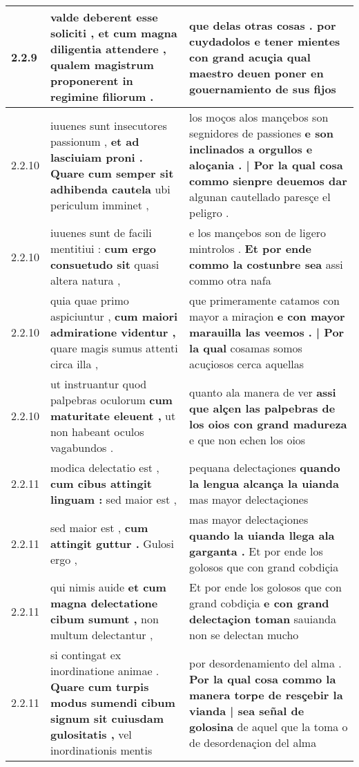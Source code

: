 \begin{tabular}{|p{1cm}|p{6.5cm}|p{6.5cm}|}
2.2.9 & valde deberent esse soliciti , \textbf{ et cum magna diligentia attendere , } qualem magistrum proponerent in regimine filiorum . & que delas otras cosas . \textbf{ por cuydadolos e tener mientes con grand acuçia } qual maestro deuen poner en gouernamiento de sus fijos \\\hline
2.2.10 & iuuenes sunt insecutores passionum , \textbf{ et ad lasciuiam proni . Quare cum semper sit adhibenda cautela } ubi periculum imminet , & los moços alos mançebos son segnidores de passiones \textbf{ e son inclinados a orgullos e aloçania . | Por la qual cosa commo sienpre deuemos dar } algunan cautellado paresçe el peligro . \\\hline
2.2.10 & iuuenes sunt de facili mentitiui : \textbf{ cum ergo consuetudo sit } quasi altera natura , & e los mançebos son de ligero mintrolos . \textbf{ Et por ende commo la costunbre sea } assi commo otra nafa \\\hline
2.2.10 & quia quae primo aspiciuntur , \textbf{ cum maiori admiratione videntur , } quare magis sumus attenti circa illa , & que primeramente catamos con mayor a miraçion \textbf{ e con mayor marauilla las veemos . | Por la qual } cosamas somos acuçiosos cerca aquellas \\\hline
2.2.10 & ut instruantur quod palpebras oculorum \textbf{ cum maturitate eleuent , } ut non habeant oculos vagabundos . & quanto ala manera de ver \textbf{ assi que alçen las palpebras de los oios con grand madureza } e que non echen los oios \\\hline
2.2.11 & modica delectatio est , \textbf{ cum cibus attingit linguam : } sed maior est , & pequana delectaçiones \textbf{ quando la lengua alcança la uianda } mas mayor delectaçiones \\\hline
2.2.11 & sed maior est , \textbf{ cum attingit guttur . } Gulosi ergo , & mas mayor delectaçiones \textbf{ quando la uianda llega ala garganta . } Et por ende los golosos que con grand cobdiçia \\\hline
2.2.11 & qui nimis auide \textbf{ et cum magna delectatione cibum sumunt , } non multum delectantur , & Et por ende los golosos que con grand cobdiçia \textbf{ e con grand delectaçion toman } sauianda non se delectan mucho \\\hline
2.2.11 & si contingat ex inordinatione animae . \textbf{ Quare cum turpis modus sumendi cibum signum sit cuiusdam gulositatis , } vel inordinationis mentis & por desordenamiento del alma . \textbf{ Por la qual cosa commo la manera torpe de resçebir la vianda | sea señal de golosina } de aquel que la toma o de desordenaçion del alma \\\hline

\end{tabular}
